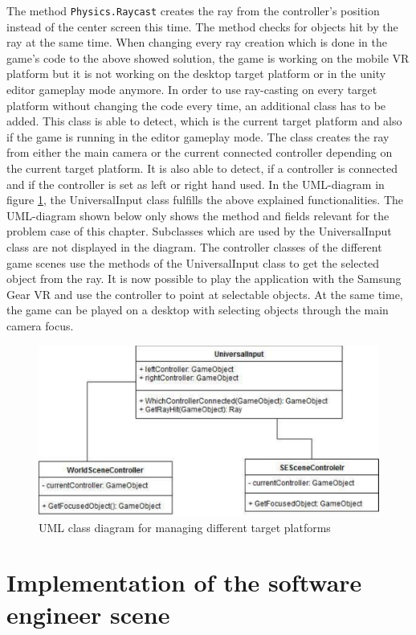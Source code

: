 The method \texttt{Physics.Raycast} creates the ray from the controller's position instead of the center screen this time. The method checks for objects hit by the ray at the same time.
When changing every ray creation which is done in the game's code to the above showed solution, the game is working on the mobile VR platform but it is not working on the desktop target platform or in the unity editor gameplay mode anymore. In order to use ray-casting on every target platform without changing the code every time, an additional class has to be added. This class is able to detect, which is the current target platform and also if the game is running in the editor gameplay mode. The class creates the ray from either the main camera or the current connected controller depending on the current target platform. It is also able to detect, if a controller is connected and if the controller is set as left or right hand used. In the UML-diagram in figure \ref{fig:uml-universalinput}, the UniversalInput class fulfills the above explained functionalities. The UML-diagram shown below only shows the method and fields relevant for the problem case of this chapter. Subclasses which are used by the UniversalInput class are not displayed in the diagram. The controller classes of the different game scenes use the methods of the UniversalInput class to get the selected object from the ray. It is now possible to play the application with the Samsung Gear VR and use the controller to point at selectable objects. At the same time, the game can be played on a desktop with selecting objects through the main camera focus.
\begin{figure}[h!]
  \includegraphics[width=13cm]{kapitel/eps/uml-input.pdf}
  \centering
  \caption{UML class diagram for managing different target platforms}
  \label{fig:uml-universalinput}
\end{figure}
\section{Implementation of the software engineer scene}
